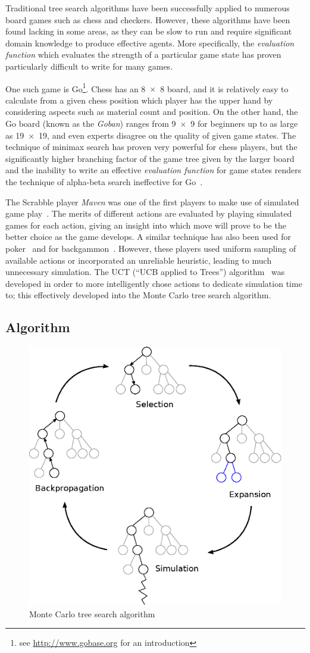 Traditional tree search algorithms have been successfully applied to numerous board games such as chess and checkers.  However, these algorithms have been found lacking in some areas, as they can be slow to run and require significant domain knowledge to produce effective agents.  More specifically, the \emph{evaluation function} which evaluates the strength of a particular game state has proven particularly difficult to write for many games.

One such game is Go\footnote{see \url{http://www.gobase.org} for an introduction}.  Chess has an 8~$\times$~8 board, and it is relatively easy to calculate from a given chess position which player has the upper hand by considering aspects such as material count and position.  On the other hand, the Go board (known as the \emph{Goban}) ranges from 9~$\times$~9 for beginners up to as large as 19~$\times$~19, and even experts disagree on the quality of given game states.  The technique of minimax search \cite[p. 165]{RussellNorvig} has proven very powerful for chess players, but the significantly higher branching factor of the game tree given by the larger board and the inability to write an effective \emph{evaluation function} for game states renders the technique of alpha-beta search ineffective for Go~\citep{Gelly2006}.

The Scrabble player \emph{Maven} was one of the first players to make use of simulated game play~\citep{Sheppard2002}.  The merits of different actions are evaluated by playing simulated games for each action, giving an insight into which move will prove to be the better choice as the game develops.  A similar technique has also been used for poker~\citep{Billings2002} and for backgammon~\citep{Tesauro1996}.  However, these players used uniform sampling of available actions or incorporated an unreliable heuristic, leading to much unnecessary simulation.  The UCT (``UCB applied to Trees'') algorithm~\citep{Kocsis2006} was developed in order to more intelligently chose actions to dedicate simulation time to; this effectively developed into the Monte Carlo tree search algorithm.

\subsection{Algorithm}

\begin{figure}[ht]
\centering
\includegraphics[width=0.5\linewidth]{diagrams/mcts}
\caption{Monte Carlo tree search algorithm}
\label{fig:MCTS}
\end{figure}

